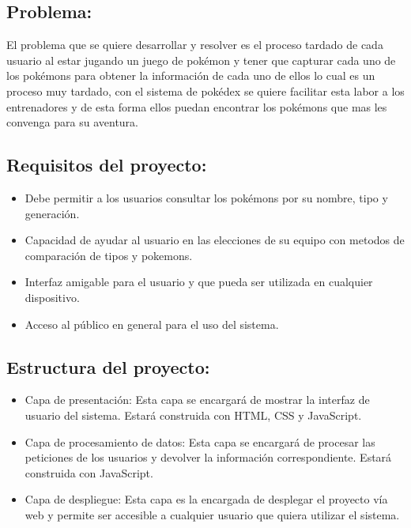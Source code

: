 \documentclass[12pt]{article}
\begin{document}
        \subsection{Problema:}
            El problema que se quiere desarrollar y resolver es el proceso tardado de cada usuario al estar jugando un juego de pokémon y tener que capturar cada uno de los pokémons para obtener la información de cada uno de ellos lo cual es un proceso muy tardado, con el sistema de pokédex se quiere facilitar esta labor a los entrenadores y de esta forma ellos puedan encontrar los pokémons que mas les convenga para su aventura.
        \subsection{Requisitos del proyecto: }
            \begin{itemize}
                \item Debe permitir a los usuarios consultar los pokémons por su nombre, tipo y generación.
                \item Capacidad de ayudar al usuario en las elecciones de su equipo con metodos de comparación de tipos y pokemons.
                \item Interfaz amigable para el usuario y que pueda ser utilizada en cualquier dispositivo.
                \item Acceso al público en general para el uso del sistema.
            \end{itemize}
            \vspace{3cm}
        \subsection{Estructura del proyecto: }
            \begin{itemize}
                \item Capa de presentación: Esta capa se encargará de mostrar la interfaz de usuario del sistema. Estará construida con HTML, CSS y JavaScript.
                \item Capa de procesamiento de datos: Esta capa se encargará de procesar las peticiones de los usuarios y devolver la información correspondiente. Estará construida con JavaScript.
                \item Capa de despliegue: Esta capa es la encargada de desplegar el proyecto vía web y permite ser accesible a cualquier usuario que quiera utilizar el sistema.
            \end{itemize}
\end{document}
